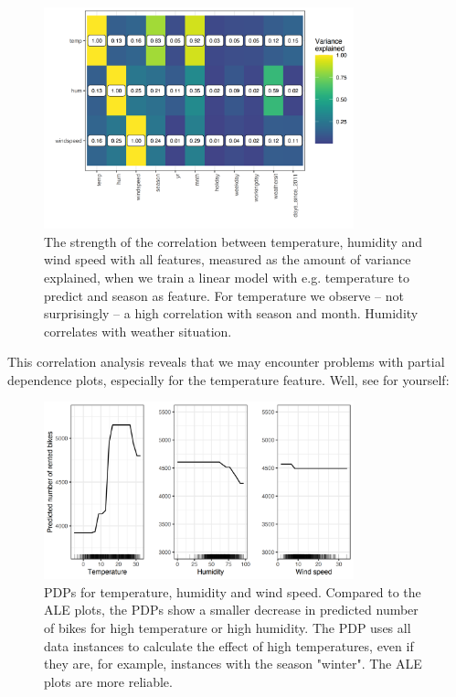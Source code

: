 \documentclass[
  11pt,
]{scrbook}
\begin{document}
\begin{figure}

{\centering \includegraphics[width=0.8\textwidth]{images/ale-bike-cor-1} 

}

\caption{The strength of the correlation between temperature, humidity and wind speed with all features, measured as the amount of variance explained, when we train a linear model with e.g. temperature to predict and season as feature. For temperature we observe -- not surprisingly -- a high correlation with season and month. Humidity correlates with weather situation.}\label{fig:ale-bike-cor}
\end{figure}

This correlation analysis reveals that we may encounter problems with partial dependence plots, especially for the temperature feature.
Well, see for yourself:

\begin{figure}

{\centering \includegraphics[width=0.8\textwidth]{images/pdp-bike-compare-1} 

}

\caption{PDPs for temperature, humidity and wind speed. Compared to the ALE plots, the PDPs show a smaller decrease in predicted number of bikes for high temperature or high humidity. The PDP uses all data instances to calculate the effect of high temperatures, even if they are, for example, instances with the season "winter". The ALE plots are more reliable.}\label{fig:pdp-bike-compare}
\end{figure}
\end{document}
